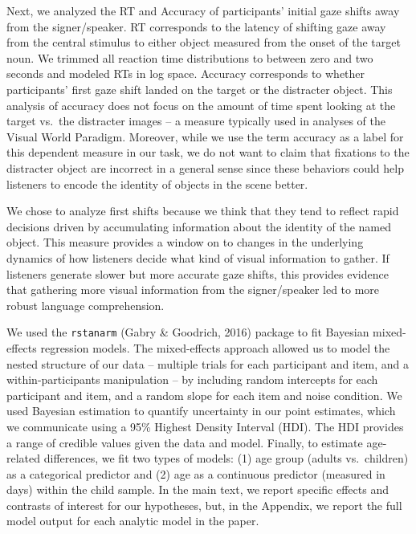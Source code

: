 \documentclass[oneside]{report}
\begin{document}
Next, we analyzed the RT and Accuracy of participants' initial gaze
shifts away from the signer/speaker. RT corresponds to the latency of
shifting gaze away from the central stimulus to either object measured
from the onset of the target noun. We trimmed all reaction time
distributions to between zero and two seconds and modeled RTs in log
space. Accuracy corresponds to whether participants' first gaze shift
landed on the target or the distracter object. This analysis of accuracy
does not focus on the amount of time spent looking at the target vs.~the
distracter images -- a measure typically used in analyses of the Visual
World Paradigm. Moreover, while we use the term accuracy as a label for
this dependent measure in our task, we do not want to claim that
fixations to the distracter object are incorrect in a general sense
since these behaviors could help listeners to encode the identity of
objects in the scene better.

We chose to analyze first shifts because we think that they tend to
reflect rapid decisions driven by accumulating information about the
identity of the named object. This measure provides a window on to
changes in the underlying dynamics of how listeners decide what kind of
visual information to gather. If listeners generate slower but more
accurate gaze shifts, this provides evidence that gathering more visual
information from the signer/speaker led to more robust language
comprehension.

We used the \texttt{rstanarm} (Gabry \& Goodrich, 2016) package to fit
Bayesian mixed-effects regression models. The mixed-effects approach
allowed us to model the nested structure of our data -- multiple trials
for each participant and item, and a within-participants manipulation --
by including random intercepts for each participant and item, and a
random slope for each item and noise condition. We used Bayesian
estimation to quantify uncertainty in our point estimates, which we
communicate using a 95\% Highest Density Interval (HDI). The HDI
provides a range of credible values given the data and model. Finally,
to estimate age-related differences, we fit two types of models: (1) age
group (adults vs.~children) as a categorical predictor and (2) age as a
continuous predictor (measured in days) within the child sample. In the
main text, we report specific effects and contrasts of interest for our
hypotheses, but, in the Appendix, we report the full model output for
each analytic model in the paper.
\end{document}
